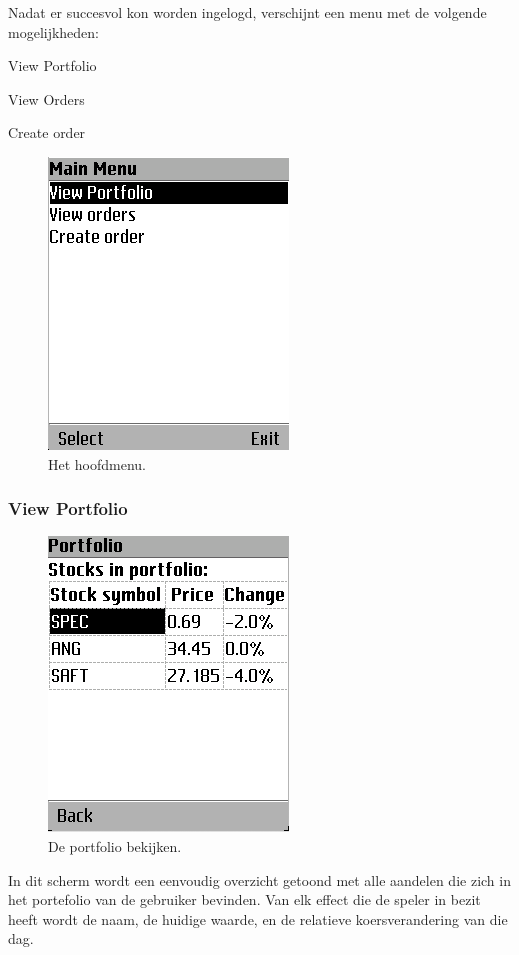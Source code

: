 Nadat er succesvol kon worden ingelogd, verschijnt een menu met de volgende mogelijkheden:
\begin{itemize_compact}
	\item{View Portfolio}
	\item{View Orders}
	\item{Create order}
\end{itemize_compact}
\begin{figure}[h!]
	\centering
		\includegraphics[scale=0.75]{images/handleiding/mobile/Mainmenu}
	\caption{Het hoofdmenu.}
	\label{fig:handl:mobile:menu}
\end{figure}

\subsubsection{View Portfolio}
\begin{figure}[h!]
	\centering
		\includegraphics[scale=0.75]{images/handleiding/mobile/Portfolio}
	\caption{De portfolio bekijken.}
	\label{fig:handl:mobile:portfolio}
\end{figure}
In dit scherm wordt een eenvoudig overzicht getoond met alle aandelen die zich in het portefolio van de gebruiker bevinden. Van elk effect die de speler in bezit heeft wordt de naam, de huidige waarde, en de relatieve  koersverandering van die dag.

